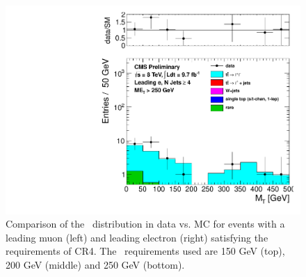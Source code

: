 \begin{figure}[hbt]
\begin{center}
        \includegraphics[width=0.5\linewidth]{plots/CR4plots/mt_met250_leadele_nj4.pdf}
    \caption{
      Comparison of the \mt\ distribution in data vs. MC for events
      with a leading muon (left) and leading electron (right)
      satisfying the requirements of CR4. The \met\ requirements used are
      150 GeV (top), 200 GeV (middle) and 250 GeV (bottom).
\label{fig:cr4mtrest} 
}  
      \end{center}
\end{figure}


\clearpage
